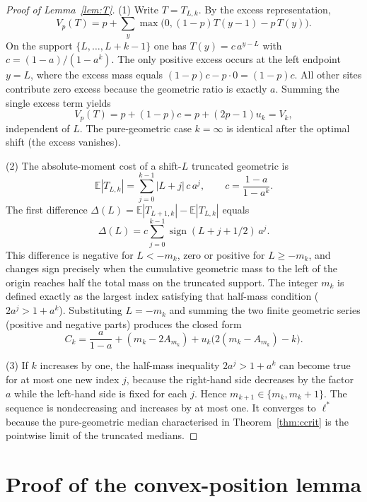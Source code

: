 \documentclass[conference]{IEEEtran}
\newcommand{\E}{\mathbb{E}}
\begin{document}
\begin{proof}[Proof of Lemma~\ref{lem:T}]
(1) Write \(T=T_{L,k}\). By the excess representation,
\[
V_p(T)=p+\sum_y\max\bigl(0,(1-p)T(y-1)-p\,T(y)\bigr).
\]
On the support \(\{L,\dots,L+k-1\}\) one has \(T(y)=c\,a^{y-L}\) with \(c=(1-a)/(1-a^k)\). The only positive excess occurs at the left endpoint \(y=L\), where the excess mass equals \((1-p)c-p\cdot0=(1-p)c\). All other sites contribute zero excess because the geometric ratio is exactly \(a\). Summing the single excess term yields
\[
V_p(T)=p+(1-p)c=p+(2p-1)u_k=V_k,
\]
independent of \(L\). The pure-geometric case \(k=\infty\) is identical after the optimal shift (the excess vanishes).

(2) The absolute-moment cost of a shift-\(L\) truncated geometric is
\[
\E|T_{L,k}|=\sum_{j=0}^{k-1}|L+j|\,c\,a^j,\qquad c=\frac{1-a}{1-a^k}.
\]
The first difference \(\Delta(L)=\E|T_{L+1,k}|-\E|T_{L,k}|\) equals
\[
\Delta(L)=c\sum_{j=0}^{k-1}\operatorname{sign}(L+j+1/2)\,a^j.
\]
This difference is negative for \(L<-m_k\), zero or positive for \(L\ge-m_k\), and changes sign precisely when the cumulative geometric mass to the left of the origin reaches half the total mass on the truncated support. The integer \(m_k\) is defined exactly as the largest index satisfying that half-mass condition (\(2a^j>1+a^k\)). Substituting \(L=-m_k\) and summing the two finite geometric series (positive and negative parts) produces the closed form
\[
C_k=\frac{a}{1-a}+(m_k-2A_{m_k})+u_k\bigl(2(m_k-A_{m_k})-k\bigr).
\]

(3) If \(k\) increases by one, the half-mass inequality \(2a^j>1+a^k\) can become true for at most one new index \(j\), because the right-hand side decreases by the factor \(a\) while the left-hand side is fixed for each \(j\). Hence \(m_{k+1}\in\{m_k,m_k+1\}\). The sequence is nondecreasing and increases by at most one. It converges to \(\ell^*\) because the pure-geometric median characterised in Theorem~\ref{thm:ccrit} is the pointwise limit of the truncated medians.
\end{proof}

\section{Proof of the convex-position lemma}
\label{app:convex}
\end{document}

